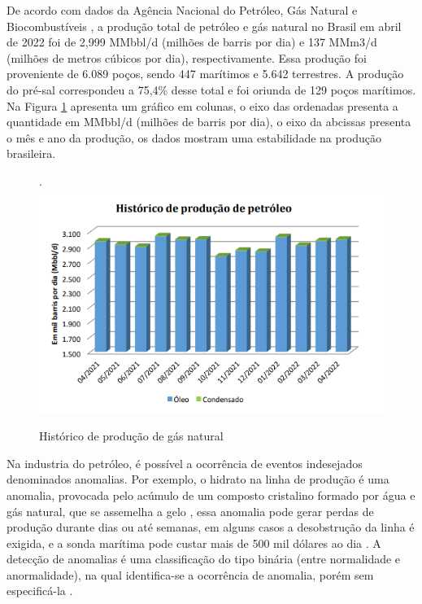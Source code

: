 De acordo com dados da Agência Nacional do Petróleo, Gás Natural e Biocombustíveis \cite{ANP2022}, a produção total de petróleo e gás natural no Brasil em abril de 2022 foi de 2,999 MMbbl/d (milhões de barris por dia) e 137 MMm3/d (milhões de metros cúbicos por dia), respectivamente. Essa produção foi proveniente de  6.089 poços, sendo 447 marítimos e 5.642 terrestres. A produção do pré-sal correspondeu a 75,4\% desse total e foi oriunda de 129 poços marítimos. Na Figura \ref{fig:Hu2018} apresenta um gráfico em colunas, o eixo das ordenadas presenta a quantidade em  MMbbl/d (milhões de barris por dia), o eixo da abcissas presenta o mês e ano da produção, os  dados mostram uma estabilidade na produção brasileira.

\begin{figure}[H]
    \centering
    \caption{Histórico de produção de gás natural}. 
    \label{fig:Hu2018}
    \includegraphics[width=130mm]{images/fig5.png}
\end{figure}

Na industria do petróleo, é possível a ocorrência de eventos indesejados denominados anomalias. Por exemplo, o hidrato na linha de produção é uma anomalia, provocada pelo acúmulo de um composto cristalino formado por água e gás natural, que se assemelha a gelo  \cite{vargas2019base}, essa anomalia pode gerar perdas de produção durante dias ou até semanas, em alguns casos a desobstrução da linha é exigida, e a sonda marítima pode custar mais de 500 mil dólares ao dia \cite{andreolli2016introduccao}.  A detecção de anomalias é uma classificação do tipo binária (entre normalidade e anormalidade), na qual identifica-se a ocorrência de anomalia, porém sem especificá-la \cite{vargas2019base}.


